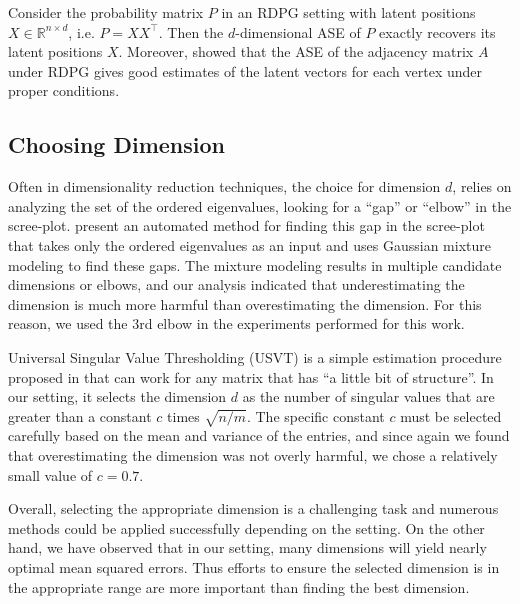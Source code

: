 Consider the probability matrix $P$ in an RDPG setting with latent positions $X \in \mathbb{R}^{n \times d}$, i.e. $P = X X^{\top}$. Then the $d$-dimensional ASE of $P$ exactly recovers its latent positions $X$.
Moreover, \citet{sussman2014consistent} showed that the ASE of the adjacency matrix $A$ under RDPG gives good estimates of the latent vectors for each vertex under proper conditions.




\subsection{Choosing Dimension}
\label{sec:dim_select}
Often in dimensionality reduction techniques, the choice for dimension $d$, relies on analyzing the set of the ordered eigenvalues, looking for a ``gap'' or ``elbow'' in the scree-plot. \citet{zhu2006automatic} present an automated method for finding this gap in the scree-plot that takes only the ordered eigenvalues as an input and uses Gaussian mixture modeling to find these gaps.
The mixture modeling results in multiple candidate dimensions or elbows, and our analysis indicated that underestimating the dimension is much more harmful than overestimating the dimension.
For this reason, we used the 3rd elbow in the experiments performed for this work.

Universal Singular Value Thresholding (USVT) is a simple estimation procedure proposed in \citet{chatterjee2015matrix} that can work for any matrix that has ``a little bit of structure''. 
In our setting, it selects the dimension $d$ as the number of singular values that are greater than a constant $c$ times $\sqrt{n/m}$.
The specific constant $c$ must be selected carefully based on the mean and variance of the entries, and since again we found that overestimating the dimension was not overly harmful, we chose a relatively small value of $c=0.7$.

Overall, selecting the appropriate dimension is a challenging task and numerous methods could be applied successfully depending on the setting.
On the other hand, we have observed that in our setting, many dimensions will yield nearly optimal mean squared errors. 
Thus efforts to ensure the selected dimension is in the appropriate range are more important than finding the best dimension.





